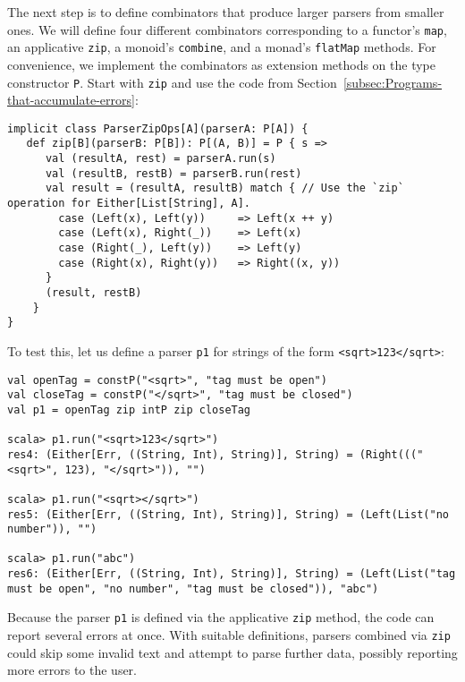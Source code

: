 The next step is to define combinators that produce larger parsers
from smaller ones. We will define four different combinators corresponding
to a functor\textsf{'}s \lstinline!map!, an applicative \lstinline!zip!,
a monoid\textsf{'}s \lstinline!combine!, and a monad\textsf{'}s \lstinline!flatMap!
methods. For convenience, we implement the combinators as extension
methods on the type constructor \lstinline!P!. Start with \lstinline!zip!
and use the code from Section~\ref{subsec:Programs-that-accumulate-errors}:
\begin{lstlisting}
implicit class ParserZipOps[A](parserA: P[A]) {
   def zip[B](parserB: P[B]): P[(A, B)] = P { s =>
      val (resultA, rest) = parserA.run(s)
      val (resultB, restB) = parserB.run(rest)
      val result = (resultA, resultB) match { // Use the `zip` operation for Either[List[String], A].
        case (Left(x), Left(y))     => Left(x ++ y)
        case (Left(x), Right(_))    => Left(x)
        case (Right(_), Left(y))    => Left(y)
        case (Right(x), Right(y))   => Right((x, y))
      }
      (result, restB)
    }
}
\end{lstlisting}
To test this, let us define a parser \lstinline!p1! for strings of
the form \lstinline!<sqrt>123</sqrt>!:
\begin{lstlisting}
val openTag = constP("<sqrt>", "tag must be open")
val closeTag = constP("</sqrt>", "tag must be closed")
val p1 = openTag zip intP zip closeTag

scala> p1.run("<sqrt>123</sqrt>")
res4: (Either[Err, ((String, Int), String)], String) = (Right((("<sqrt>", 123), "</sqrt>")), "")

scala> p1.run("<sqrt></sqrt>")
res5: (Either[Err, ((String, Int), String)], String) = (Left(List("no number")), "")

scala> p1.run("abc")
res6: (Either[Err, ((String, Int), String)], String) = (Left(List("tag must be open", "no number", "tag must be closed")), "abc")
\end{lstlisting}
Because the parser \lstinline!p1! is defined via the applicative
\lstinline!zip! method, the code can report several errors at once.
With suitable definitions, parsers combined via \lstinline!zip! could
skip some invalid text and attempt to parse further data, possibly
reporting more errors to the user.

